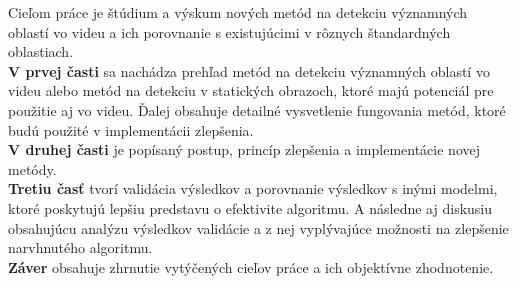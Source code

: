 Cieľom práce je štúdium a výskum nových metód na detekciu významných oblastí vo videu a ich porovnanie s existujúcimi v rôznych štandardných oblastiach.
\\
\textbf{V prvej časti} sa nachádza prehľad metód na detekciu významných oblastí vo videu alebo metód na detekciu v statických obrazoch, ktoré majú potenciál pre použitie aj vo videu.
Ďalej obsahuje detailné vysvetlenie fungovania metód, ktoré budú použité v implementácii zlepšenia.
\\
\textbf{V druhej časti} je popísaný postup, princíp zlepšenia a implementácie novej metódy.
\\
\textbf{Tretiu časť} tvorí validácia výsledkov a porovnanie výsledkov s inými modelmi, ktoré poskytujú lepšiu predstavu o efektivite algoritmu. A následne aj diskusiu obsahujúcu analýzu výsledkov validácie a z nej vyplývajúce možnosti na zlepšenie narvhnutého algoritmu.
\\
\textbf{Záver} obsahuje zhrnutie vytýčených cieľov práce a ich objektívne zhodnotenie.
